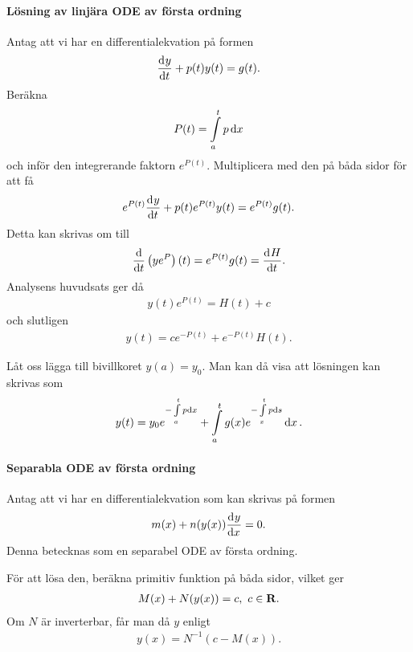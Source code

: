 \paragraph{Lösning av linjära ODE av första ordning}
Antag att vi har en differentialekvation på formen
\begin{align*}
	\dv[]{y}{t} (t) + p(t)y(t) = g(t).
\end{align*}
Beräkna
\begin{align*}
	P(t) = \int\limits_{a}^{t}p\dd{x}
\end{align*}
och inför den integrerande faktorn $e^{P(t)}$. Multiplicera med den på båda sidor för att få
\begin{align*}
	e^{P(t)}\dv[]{y}{t} (t) + p(t)e^{P(t)}y(t) = e^{P(t)}g(t).
\end{align*}
Detta kan skrivas om till
\begin{align*}
	\dv{t}\left(ye^{P}\right)(t) = e^{P(t)}g(t) = \dv[]{H}{t} (t).
\end{align*}
Analysens huvudsats ger då
\begin{align*}
	y(t)e^{P(t)} = H(t) + c
\end{align*}
och slutligen
\begin{align*}
	y(t) = ce^{-P(t)} + e^{-P(t)}H(t).
\end{align*}

Låt oss lägga till bivillkoret $y(a) = y_0$. Man kan då visa att lösningen kan skrivas som
\begin{align*}
	y(t) = y_0e^{-\int\limits_{a}^{t}p\dd{x}} + \int\limits_{a}^{t}g(x)e^{-\int\limits_{x}^{t}p\dd{s}}\dd{x}.
\end{align*}

\paragraph{Separabla ODE av första ordning}
Antag att vi har en differentialekvation som kan skrivas på formen
\begin{align*}
	m(x) + n(y(x))\dv[]{y}{x} (x) = 0.
\end{align*}
Denna betecknas som en separabel ODE av första ordning.

För att lösa den, beräkna primitiv funktion på båda sidor, vilket ger
\begin{align*}
	M(x) + N(y(x)) = c,\ c\in\mathbf{R}.
\end{align*}
Om $N$ är inverterbar, får man då $y$ enligt
\begin{align*}
	y(x) = N^{-1}(c - M(x)).
\end{align*}